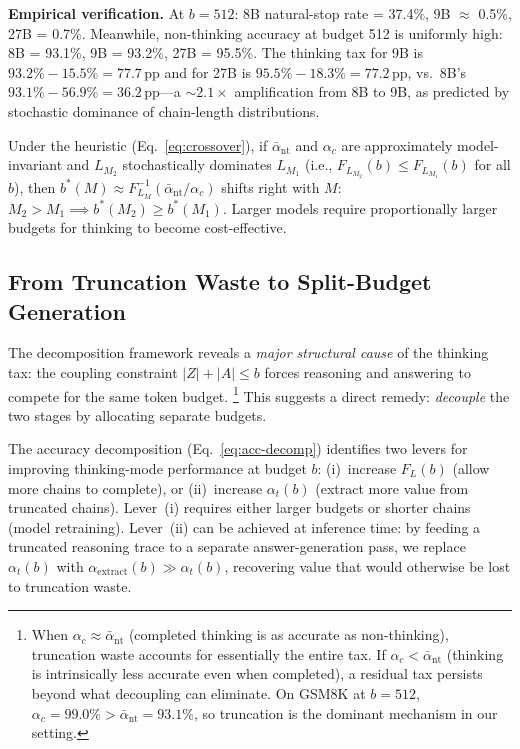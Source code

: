 \noindent
\textbf{Empirical verification.}
At $b{=}512$: 8B natural-stop rate = 37.4\%, 9B $\approx$ 0.5\%, 27B = 0.7\%.
Meanwhile, non-thinking accuracy at budget 512 is uniformly high: 8B = 93.1\%, 9B = 93.2\%, 27B = 95.5\%.
The thinking tax for 9B is $93.2\% - 15.5\% = 77.7$\,pp and for 27B is $95.5\% - 18.3\% = 77.2$\,pp, vs.\
8B's $93.1\% - 56.9\% = 36.2$\,pp---a ${\sim}2.1\times$ amplification from 8B to 9B,
as predicted by stochastic dominance of chain-length distributions.

\begin{corollary}
\label{cor:crossover-scaling}
Under the heuristic (Eq.~\ref{eq:crossover}), if
$\bar{\alpha}_{\mathrm{nt}}$ and $\alpha_c$ are approximately
model-invariant and $L_{M_2}$ stochastically dominates $L_{M_1}$
(i.e., $F_{L_{M_2}}(b) \le F_{L_{M_1}}(b)$ for all $b$),
then
$b^*(M) \approx F_{L_M}^{-1}(\bar{\alpha}_{\mathrm{nt}}/\alpha_c)$
shifts right with $M$:
$M_2 > M_1 \implies b^*(M_2) \ge b^*(M_1)$.
Larger models require proportionally larger budgets for thinking to
become cost-effective.
\end{corollary}

\subsection{From Truncation Waste to Split-Budget Generation}
\label{sec:theory:bridge}

The decomposition framework reveals a \emph{major structural cause} of
the thinking tax: the coupling constraint $|Z| + |A| \le b$ forces
reasoning and answering to compete for the same token budget.%
\footnote{When $\alpha_c \approx \bar{\alpha}_{\mathrm{nt}}$ (completed
thinking is as accurate as non-thinking), truncation waste accounts for
essentially the entire tax.
If $\alpha_c < \bar{\alpha}_{\mathrm{nt}}$ (thinking is intrinsically
less accurate even when completed), a residual tax persists beyond what
decoupling can eliminate.
On GSM8K at $b{=}512$, $\alpha_c = 99.0\% > \bar{\alpha}_{\mathrm{nt}}
= 93.1\%$, so truncation is the dominant mechanism in our setting.}
This suggests a direct remedy: \emph{decouple} the two stages by
allocating separate budgets.

\begin{remark}
\label{rem:split-bridge}
The accuracy decomposition (Eq.~\ref{eq:acc-decomp}) identifies two
levers for improving thinking-mode performance at budget $b$:
(i)~increase $F_L(b)$ (allow more chains to complete), or
(ii)~increase $\alpha_t(b)$ (extract more value from truncated chains).
Lever~(i) requires either larger budgets or shorter chains (model retraining).
Lever~(ii) can be achieved at inference time: by feeding a truncated
reasoning trace to a separate answer-generation pass, we replace
$\alpha_t(b)$ with $\alpha_{\mathrm{extract}}(b) \gg \alpha_t(b)$,
recovering value that would otherwise be lost to truncation waste.
\end{remark}

